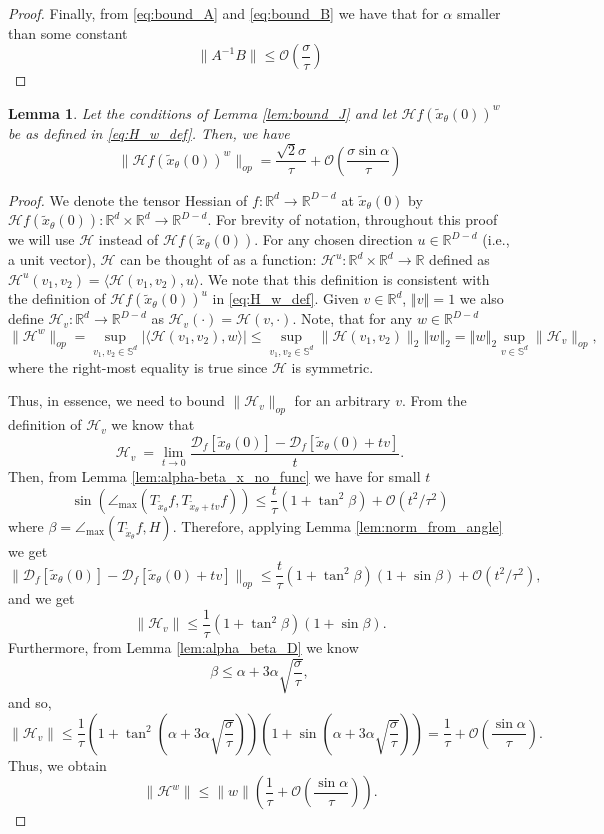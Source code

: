 \documentclass[12pt]{article}
\newtheorem{Lemma}[Theorem]{Lemma}
\theoremstyle{remark}
\newcommand{\RR}{\mathbb{R}}
\newcommand{\DD}{\mathcal{D}}
\newcommand{\OO}{\mathcal{O}}
\newcommand{\HH}{\mathcal{H}}
\newcommand{\norm}[1]{\left\Vert #1 \right\Vert}
\newcommand{\wtilde}[1]{\widetilde{#1}}
\newcommand{\lrangle}[1]{\langle #1 \rangle}
\newcommand{\maxangle}{\angle_{\max}}
\begin{document}
\begin{appendices}
\begin{proof}
Finally, from  \eqref{eq:bound_A} and \eqref{eq:bound_B} we have that for $\alpha$ smaller than some constant
\[
\|A^{-1}B\| \leq \OO(\frac{\sigma}{\tau})
\]
\end{proof}

\begin{Lemma}\label{lem:bound_DDf}
Let the conditions of Lemma \ref{lem:bound_J} and let $\HH f(\wtilde x_\theta(0))^w$ be as defined in \eqref{eq:H_w_def}.
Then, we have
\[
\|\HH f(\wtilde x_\theta(0))^w\|_{op} = \frac{\sqrt{2}\sigma}{\tau} + \OO\left(\frac{\sigma\sin \alpha}{\tau}\right)
\]
\end{Lemma}
\begin{proof}
We denote the tensor Hessian of $f:\RR^d\to\RR^{D-d}$ at $\wtilde x_\theta(0)$ by $\HH f(\wtilde x_\theta(0)):\RR^d\times\RR^d \to \RR^{D-d}$. 
For brevity of notation, throughout this proof we will use $\HH$ instead of $\HH f(\wtilde x_\theta(0))$. For any chosen direction $u\in \RR^{D-d}$ (i.e., a unit vector), $\HH$ can be thought of as a function:
$\HH ^u:\RR^d\times\RR^d \to \RR$
defined as $\HH ^u(v_1,v_2) = \lrangle{\HH (v_1,v_2), u}$. 
We note that this definition is consistent with the definition of $\HH f(\wtilde x_\theta(0))^u$ in \eqref{eq:H_w_def}.
Given $v\in\RR^d$, $\norm{v} = 1$ we also define $\HH_v:\RR^d \to \RR^{D-d}$
as $\HH_v(\cdot) = \HH(v,\cdot)$.
Note, that for any $w\in \RR^{D-d}$ 
\[
{\|\HH^w\|_{op}} = {\sup\limits_{v_1, v_2\in \mathbb{S}^{d}}|\lrangle{\HH(v_1, v_2), w}|} 
\leq \sup\limits_{v_1, v_2\in \mathbb{S}^{d}}\|\HH(v_1, v_2)\|_2\norm{w}_2
= \norm{w}_2\sup_{v\in\mathbb{S}^d}\|\HH_v\|_{op}
,\]
where the right-most equality is true since $\HH$ is symmetric.

Thus, in essence, we need to bound $\|\HH_v\|_{op}$ for an arbitrary $v$. 
From the definition of $\HH_v$ we know that 
\[
\HH_v\ =  \lim_{t\to 0} \frac{\DD_f[\wtilde x_\theta(0)] - \DD_f[\wtilde x_\theta(0) + tv]}{t} 
.\]
Then, from Lemma \ref{lem:alpha-beta_x_no_func}  we have for small $t$
\[
\sin(\maxangle (T_{\wtilde x_\theta}f,T_{\wtilde x_\theta + tv}f))\leq \frac{t}{\tau}(1+\tan^2\beta)+\OO(t^2/\tau^2)
\]
where $\beta = \maxangle(T_{\wtilde x_\theta}f,H)$. 
Therefore, applying Lemma \ref{lem:norm_from_angle} we get 
\[
 \|\DD_f[\wtilde x_\theta(0)] - \DD_f[\wtilde x_\theta(0) + tv] \|_{op} \leq \frac{t}{\tau}(1+\tan^2\beta)(1+\sin \beta) + \OO(t^2/\tau^2)
,\]
and we get 
\[
\|\HH_v\| \leq  \frac{1}{\tau}(1+\tan^2\beta)(1+\sin \beta)
.\]
Furthermore, from Lemma \ref{lem:alpha_beta_D} we know 
\[
\beta \leq \alpha + 3\alpha\sqrt{\frac{\sigma}{\tau}}
,\]
and so,
\[
\|\HH_v\| \leq  \frac{1}{\tau}(1+\tan^2
\left(\alpha + 3\alpha\sqrt{\frac{\sigma}{\tau}}\right))(1+\sin \left(\alpha + 3\alpha\sqrt{\frac{\sigma}{\tau}}\right))
= \frac{1}{\tau} + \OO(\frac{\sin \alpha}{\tau})
.\]
Thus, we obtain
\begin{equation}\label{eq:norm_H^w_bound}
\|\HH^w\| \leq \|w\| \left(\frac{1}{\tau} + \OO(\frac{\sin \alpha}{\tau})\right)    
.\end{equation}



\end{proof}
\end{appendices}
\end{document}
